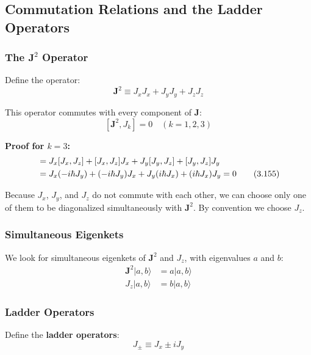 \documentclass[11pt,a4paper]{article}
\begin{document}
\subsection{Commutation Relations and the Ladder Operators}

\subsubsection{The $\mathbf{J}^2$ Operator}

Define the operator:
\begin{equation}
\mathbf{J}^2 \equiv J_x J_x + J_y J_y + J_z J_z
\tag{3.153}
\end{equation}

This operator commutes with every component of $\mathbf{J}$:
\begin{equation}
\boxed{[\mathbf{J}^2, J_k] = 0 \quad (k = 1, 2, 3)}
\tag{3.154}
\end{equation}

\textbf{Proof for $k = 3$:}
\begin{align}
[J_x J_x + J_y J_y + J_z J_z, J_z] &= J_x[J_x, J_z] + [J_x, J_z]J_x + J_y[J_y, J_z] + [J_y, J_z]J_y \notag \\
&= J_x(-i\hbar J_y) + (-i\hbar J_y)J_x + J_y(i\hbar J_x) + (i\hbar J_x)J_y = 0
\tag{3.155}
\end{align}

Because $J_x$, $J_y$, and $J_z$ do not commute with each other, we can choose only one of them to be diagonalized simultaneously with $\mathbf{J}^2$. By convention we choose $J_z$.

\subsubsection{Simultaneous Eigenkets}

We look for simultaneous eigenkets of $\mathbf{J}^2$ and $J_z$, with eigenvalues $a$ and $b$:
\begin{align}
\mathbf{J}^2|a, b\rangle &= a|a, b\rangle \tag{3.156a} \\
J_z|a, b\rangle &= b|a, b\rangle \tag{3.156b}
\end{align}

\subsubsection{Ladder Operators}

Define the \textbf{ladder operators}:
\begin{equation}
\boxed{J_\pm \equiv J_x \pm iJ_y}
\tag{3.157}
\end{equation}
\end{document}
